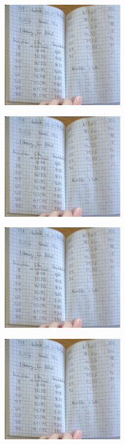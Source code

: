 \begin{minipage}[t]{0.4\textwidth}
   \includegraphics[height=4.5cm, page=1]{Abbildungen/v701_messdaten.pdf}
\end{minipage}
\begin{minipage}[t]{0.4\textwidth}
   \includegraphics[height=4.5cm, keepaspectratio, page=2]{Abbildungen/v701_messdaten.pdf}
\end{minipage}
\begin{minipage}[t]{0.4\textwidth}
    \includegraphics[height=4.5cm, page=3]{Abbildungen/v701_messdaten.pdf}
 \end{minipage}
 \begin{minipage}[t]{0.4\textwidth}
    \includegraphics[height=4.5cm, keepaspectratio, page=4]{Abbildungen/v701_messdaten.pdf}
 \end{minipage}


